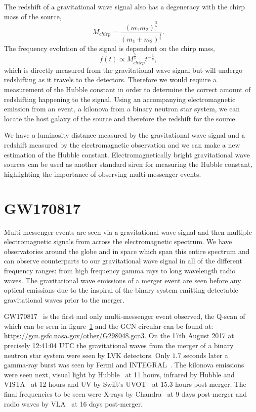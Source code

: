 The redshift of a gravitational wave signal also has a degeneracy with the chirp mass of the source,
%
\begin{equation}
M_{chirp} = \frac{(m_1 m_2)^{\frac{3}{5}}}{(m_1 + m_2)^{\frac{1}{5}}}.
\end{equation}
%
The frequency evolution of the signal is dependent on the chirp mass,
%
\begin{equation}
f(t) \propto M_{chirp}^{\frac{5}{8}}t^{-\frac{3}{8}},
\end{equation}
%
which is directly measured from the gravitational wave signal but will undergo redshifting as it travels to the detectors. Therefore we would require a measurement of the Hubble constant in order to determine the correct amount of redshifting happening to the signal. Using an accompanying electromagnetic emission from an event, a kilonova from a binary neutron star system, we can locate the host galaxy of the source and therefore the redshift for the source.

We have a luminosity distance measured by the gravitational wave signal and a redshift measured by the electromagnetic observation and we can make a new estimation of the Hubble constant. Electromagnetically bright gravitational wave sources can be used as another standard siren for measuring the Hubble constant, highlighting the importance of observing multi-messenger events.

\section{GW170817}

Multi-messenger events are seen via a gravitational wave signal and then multiple electromagnetic signals from across the electromagnetic spectrum. We have observatories around the globe and in space which span this entire spectrum and can observe counterparts to our gravitational wave signal in all of the different frequency ranges: from high frequency gamma rays to long wavelength radio waves. The gravitational wave emissions of a merger event are seen before any optical emissions due to the inspiral of the binary system emitting detectable gravitational waves prior to the merger.

GW170817~\cite{GW170817} is the first and only multi-messenger event observed, the Q-scan of which can be seen in figure~\ref{} and the GCN circular can be found at: \href{https://gcn.gsfc.nasa.gov/other/G298048.gcn3}{https://gcn.gsfc.nasa.gov/other/G298048.gcn3}. On the 17th August 2017 at precisely 12:41:04 UTC the gravitational waves from the merger of a binary neutron star system were seen by LVK detectors. Only $1.7$ seconds later a gamma-ray burst was seen by Fermi and INTEGRAL~\cite{}. The kilonova emissions were seen next, visual light by Hubble~\cite{} at 11 hours, infrared by Hubble and VISTA~\cite{} at 12 hours and UV by Swift's UVOT~\cite{} at 15.3 hours post-merger. The final frequencies to be seen were X-rays by Chandra~\cite{} at 9 days post-merger and radio waves by VLA~\cite{} at 16 days post-merger. 

